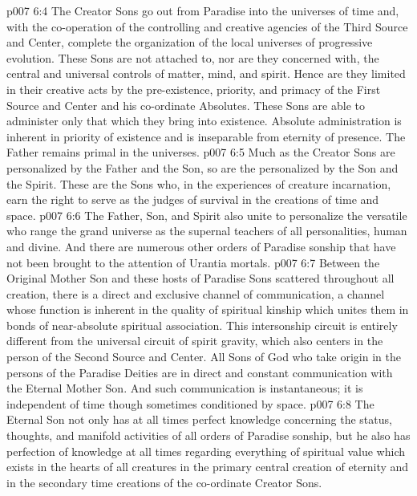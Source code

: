 \vs p007 6:4 The Creator Sons go out from Paradise into the universes of time and, with the co\hyp{}operation of the controlling and creative agencies of the Third Source and Center, complete the organization of the local universes of progressive evolution. These Sons are not attached to, nor are they concerned with, the central and universal controls of matter, mind, and spirit. Hence are they limited in their creative acts by the pre\hyp{}existence, priority, and primacy of the First Source and Center and his co\hyp{}ordinate Absolutes. These Sons are able to administer only that which they bring into existence. Absolute administration is inherent in priority of existence and is inseparable from eternity of presence. The Father remains primal in the universes.\plusone
\pc \vs p007 6:5 Much as the Creator Sons are personalized by the Father and the Son, so are the  personalized by the Son and the Spirit. These are the Sons who, in the experiences of creature incarnation, earn the right to serve as the judges of survival in the creations of time and space.
\pc \vs p007 6:6 The Father, Son, and Spirit also unite to personalize the versatile  who range the grand universe as the supernal teachers of all personalities, human and divine. And there are numerous other orders of Paradise sonship that have not been brought to the attention of Urantia mortals.
\pc \vs p007 6:7 Between the Original Mother Son and these hosts of Paradise Sons scattered throughout all creation, there is a direct and exclusive channel of communication, a channel whose function is inherent in the quality of spiritual kinship which unites them in bonds of near\hyp{}absolute spiritual association. This intersonship circuit is entirely different from the universal circuit of spirit gravity, which also centers in the person of the Second Source and Center. All Sons of God who take origin in the persons of the Paradise Deities are in direct and constant communication with the Eternal Mother Son. And such communication is instantaneous; it is independent of time though sometimes conditioned by space.
\vs p007 6:8 The Eternal Son not only has at all times perfect knowledge concerning the status, thoughts, and manifold activities of all orders of Paradise sonship, but he also has perfection of knowledge at all times regarding everything of spiritual value which exists in the hearts of all creatures in the primary central creation of eternity and in the secondary time creations of the co\hyp{}ordinate Creator Sons.
